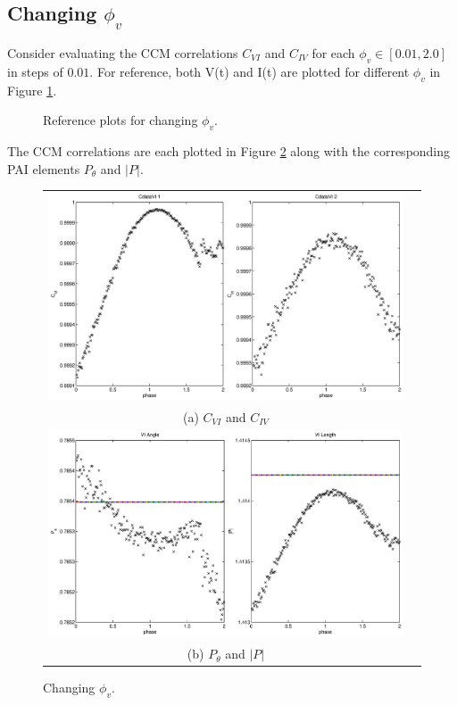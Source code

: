 \documentclass{article}
\begin{document}
\subsection{Changing $\phi_v$}
Consider evaluating the CCM correlations $C_{VI}$ and $C_{IV}$ for each $\phi_v\in[0.01,2.0]$ in steps of $0.01$.  For reference, both V(t) and I(t) are plotted for different $\phi_v$ in Figure \ref{fig:Pvref}.
\begin{figure}[H]
\caption{Reference plots for changing $\phi_v$.}
\label{fig:Pvref}
\end{figure}

The CCM correlations are each plotted in Figure \ref{fig:Pv} along with the corresponding PAI elements $P_\theta$ and $|P|$.
\begin{figure}[H]
\begin{tabular}{cc}
\includegraphics[scale=0.5]{RLcirc_varyV_phase2.eps} \\
(a) $C_{VI}$ and $C_{IV}$ \\[6pt]
\includegraphics[scale=0.5]{RLcirc_varyV_phase.eps} \\
(b) $P_\theta$ and $|P|$ \\[6pt]
\end{tabular}
\caption{Changing $\phi_v$.}
\label{fig:Pv}
\end{figure}
\end{document}
